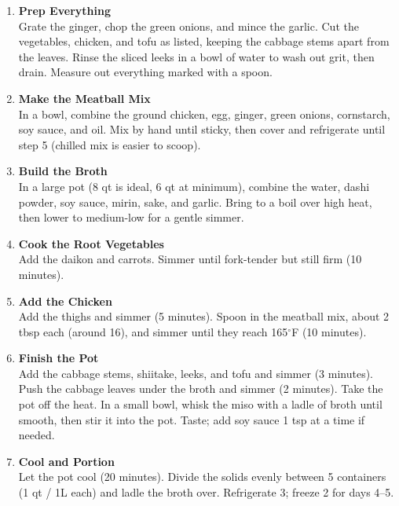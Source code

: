 \begin{enumerate}

      \item \textbf{Prep Everything} \\
            Grate the ginger, chop the green onions, and mince the garlic. Cut the vegetables,
            chicken, and tofu as listed, keeping the cabbage stems apart from the leaves. Rinse
            the sliced leeks in a bowl of water to wash out grit, then drain. Measure out
            everything marked with a spoon.

      \item \textbf{Make the Meatball Mix} \\
            In a bowl, combine the ground chicken, egg, ginger, green onions, cornstarch, soy
            sauce, and oil. Mix by hand until sticky, then cover and refrigerate until step 5
            (chilled mix is easier to scoop).

      \item \textbf{Build the Broth} \\
            In a large pot (8 qt is ideal, 6 qt at minimum), combine the water, dashi powder, soy
            sauce, mirin, sake, and garlic. Bring to a boil over high heat, then lower to
            medium-low for a gentle simmer.

      \item \textbf{Cook the Root Vegetables} \\
            Add the daikon and carrots. Simmer until fork-tender but still firm (10 minutes).

      \item \textbf{Add the Chicken} \\
            Add the thighs and simmer (5 minutes). Spoon in the meatball mix, about 2 tbsp each
            (around 16), and simmer until they reach 165$^\circ$F (10 minutes).

      \item \textbf{Finish the Pot} \\
            Add the cabbage stems, shiitake, leeks, and tofu and simmer (3 minutes). Push the
            cabbage leaves under the broth and simmer (2 minutes). Take the pot off the heat. In a
            small bowl, whisk the miso with a ladle of broth until smooth, then stir it into the
            pot. Taste; add soy sauce 1 tsp at a time if needed.

      \item \textbf{Cool and Portion} \\
            Let the pot cool (20 minutes). Divide the solids evenly between 5 containers (1 qt /
            1L each) and ladle the broth over. Refrigerate 3; freeze 2 for days 4--5.


\end{enumerate}
